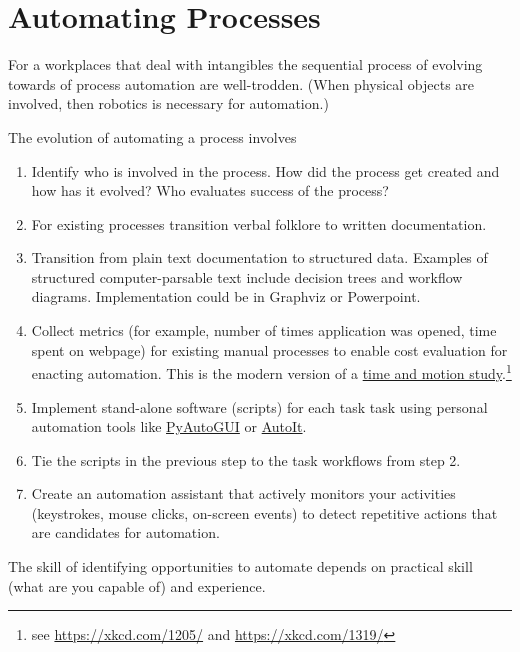 \section{Automating Processes}


For a workplaces that deal with intangibles the sequential process of evolving towards of process automation are well-trodden.  (When physical objects are involved, then robotics is necessary for automation.)

The evolution of automating a process involves
\begin{enumerate}
    \item Identify who is involved in the process. How did the process get created and how has it evolved? Who evaluates success of the process? 
    \item For existing processes transition verbal folklore to written documentation.
    \item Transition from plain text documentation to structured data. Examples of structured computer-parsable text include  decision trees and workflow diagrams. Implementation could be in Graphviz or Powerpoint.
    \item Collect metrics (for example, number of times application was opened, time spent on webpage) for existing manual processes to enable cost evaluation for enacting automation. This is the modern version of a \href{https://en.wikipedia.org/wiki/Time_and_motion_study}{time and motion study}.\footnote{see \href{https://xkcd.com/1205/}{https://xkcd.com/1205/} and \href{https://xkcd.com/1319/}{https://xkcd.com/1319/}}
    \item Implement stand-alone software (scripts) for each task task using personal automation tools like \href{https://pyautogui.readthedocs.io/en/latest/}{PyAutoGUI} or \href{https://www.autoitscript.com/site/}{AutoIt}.
    \item Tie the scripts in the previous step to the task workflows from step 2.
    \item Create an automation assistant that actively monitors your activities (keystrokes, mouse clicks, on-screen events) to detect repetitive actions that are candidates for automation.
\end{enumerate}

The skill of identifying opportunities to automate depends on practical skill (what are you capable of) and experience.

